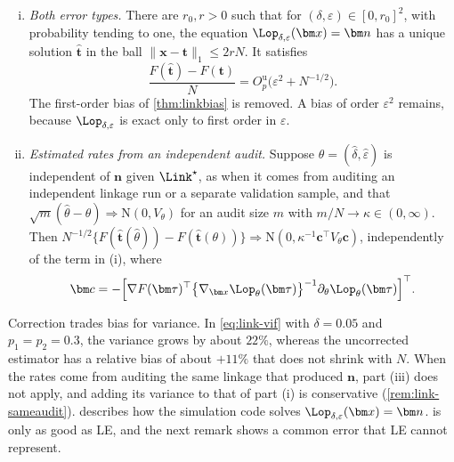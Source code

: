 \begin{corollary}
\begin{enumerate}[(i)]
  \begin{equation}\label{eq:link-vif}
    \frac{v_{\mathrm{cap}}+v_{\mathrm{link}}}{v_{\mathrm{cap}}}=1+\frac{(1-\delta)^{-2}-1}{(1-p_1)(1-p_2)},
  \end{equation}
  and the corrected estimator is $(1-\delta)^2n_{1+}n_{2+}/n_{11}$.
  \item \emph{Both error types.} There are $r_0,r>0$ such that for $(\delta,\varepsilon)\in[0,r_0]^2$, with probability tending to one, the equation $\Lop_{\delta,\varepsilon}(\bm x)=\bm n$ has a unique solution $\hat{\bm t}$ in the ball $\|\bm x-\bm t\|_1\le2rN$. It satisfies
  \[
    \frac{F(\hat{\bm t})-F(\bm t)}{N}=O_p^{\mathrm u}\bigl(\varepsilon^2+N^{-1/2}\bigr).
  \]
  The first-order bias of \cref{thm:linkbias} is removed. A bias of order $\varepsilon^2$ remains, because $\Lop_{\delta,\varepsilon}$ is exact only to first order in $\varepsilon$.
  \item \emph{Estimated rates from an independent audit.} Suppose $\hat\theta=(\hat\delta,\hat\varepsilon)$ is independent of $\bm n$ given $\Link^\star$, as when it comes from auditing an independent linkage run or a separate validation sample, and that $\sqrt m(\hat\theta-\theta)\Rightarrow\mathrm N(0,V_\theta)$ for an audit size $m$ with $m/N\to\kappa\in(0,\infty)$. Then $N^{-1/2}\{F(\hat{\bm t}(\hat\theta))-F(\hat{\bm t}(\theta))\}\Rightarrow\mathrm N(0,\kappa^{-1}\bm c^{\top}V_\theta\bm c)$, independently of the term in (i), where
  \[
    \bm c=-\Bigl[\nabla F(\bm\tau)^{\top}\bigl\{\nabla_{\bm x}\Lop_\theta(\bm\tau)\bigr\}^{-1}\partial_\theta\Lop_\theta(\bm\tau)\Bigr]^{\top} .
  \]
\end{enumerate}
\end{corollary}

Correction trades bias for variance. In \eqref{eq:link-vif} with $\delta=0.05$ and $p_1=p_2=0.3$, the variance grows by about $22\%$, whereas the uncorrected estimator has a relative bias of about $+11\%$ that does not shrink with $N$. When the rates come from auditing the same linkage that produced $\bm n$, part (iii) does not apply, and adding its variance to that of part (i) is conservative (\cref{rem:link-sameaudit}).  describes how the simulation code solves $\Lop_{\delta,\varepsilon}(\bm x)=\bm n$.  is only as good as LE, and the next remark shows a common error that LE cannot represent.

